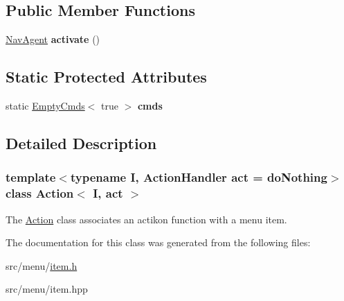 \subsection*{Public Member Functions}
\begin{DoxyCompactItemize}
\item 
\mbox{\label{classAction_a1a642e0df4201fa781e8143da61fd808}} 
\hyperlink{structNavAgent}{Nav\+Agent} {\bfseries activate} ()
\end{DoxyCompactItemize}
\subsection*{Static Protected Attributes}
\begin{DoxyCompactItemize}
\item 
\mbox{\label{classAction_a57b5b2e5b0668ae93053afc3a48ebc81}} 
static \hyperlink{structEmptyCmds}{Empty\+Cmds}$<$ true $>$ {\bfseries cmds}
\end{DoxyCompactItemize}


\subsection{Detailed Description}
\subsubsection*{template$<$typename I, Action\+Handler act = do\+Nothing$>$\newline
class Action$<$ I, act $>$}

The \hyperlink{classAction}{Action} class associates an actikon function with a menu item. 

The documentation for this class was generated from the following files\+:\begin{DoxyCompactItemize}
\item 
src/menu/\hyperlink{item_8h}{item.\+h}\item 
src/menu/item.\+hpp\end{DoxyCompactItemize}
